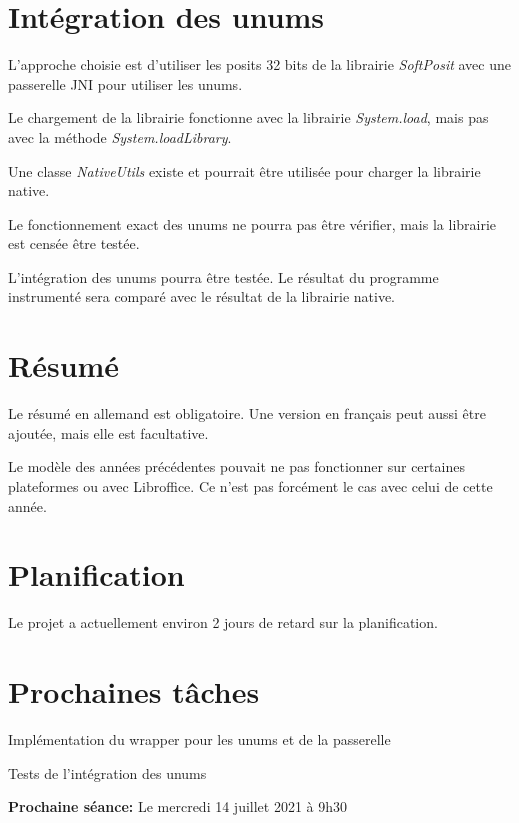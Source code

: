 \documentclass[11pt]{meetingmins}
\begin{document}
\section{Intégration des unums}
\begin{hiddenitems}
    \item L'approche choisie est d'utiliser les posits 32 bits de la librairie \textit{SoftPosit} avec une passerelle JNI pour utiliser les unums.
    \item Le chargement de la librairie fonctionne avec la librairie \textit{System.load}, mais pas avec la méthode \textit{System.loadLibrary}.
    \item Une classe \textit{NativeUtils} existe et pourrait être utilisée pour charger la librairie native.
    \item Le fonctionnement exact des unums ne pourra pas être vérifier, mais la librairie est censée être testée.
    \item L'intégration des unums pourra être testée. Le résultat du programme instrumenté sera comparé avec le résultat de la librairie native.
\end{hiddenitems}

\section{Résumé}
\begin{hiddenitems}
    \item Le résumé en allemand est obligatoire. Une version en français peut aussi être ajoutée, mais elle est facultative.
    \item Le modèle des années précédentes pouvait ne pas fonctionner sur certaines plateformes ou avec Libroffice. Ce n'est pas forcément le cas avec celui de cette année.
\end{hiddenitems}

\section{Planification}
\begin{hiddenitems}
    \item Le projet a actuellement environ 2 jours de retard sur la planification.
\end{hiddenitems}

\section{Prochaines tâches}
\begin{hiddenitems}
    \item Implémentation du wrapper pour les unums et de la passerelle
    \item Tests de l'intégration des unums
\end{hiddenitems}

\vspace{1em}
\par \noindent \textbf {Prochaine séance:} Le mercredi 14 juillet 2021 à 9h30
\end{document}
